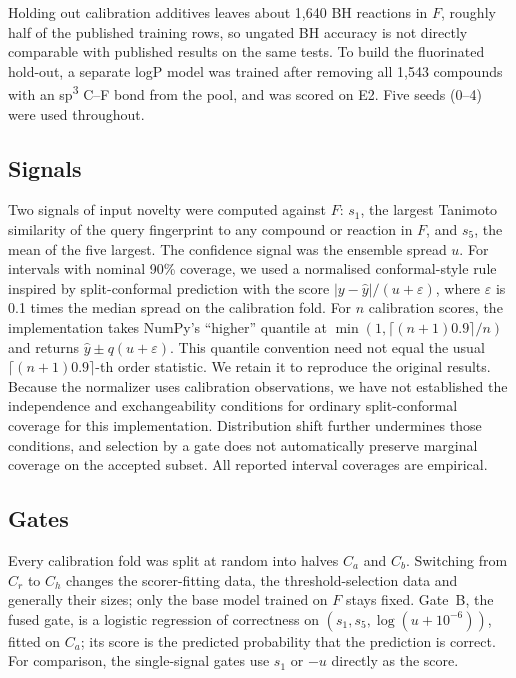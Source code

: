 \documentclass[11pt,letterpaper]{article}
\begin{document}
Holding out calibration additives leaves about 1,640 BH reactions in $F$, roughly half of the published training rows, so ungated BH accuracy is not directly comparable with published results on the same tests. To build the fluorinated hold-out, a separate logP model was trained after removing all 1,543 compounds with an sp\textsuperscript{3} C--F bond from the pool, and was scored on E2. Five seeds (0--4) were used throughout.

\subsection{Signals}

Two signals of input novelty were computed against $F$: $s_1$, the largest Tanimoto similarity of the query fingerprint to any compound or reaction in $F$, and $s_5$, the mean of the five largest. The confidence signal was the ensemble spread $u$. For intervals with nominal 90\% coverage, we used a normalised conformal-style rule inspired by split-conformal prediction\cite{lei2018} with the score $|y-\hat{y}|/(u+\varepsilon)$, where $\varepsilon$ is 0.1 times the median spread on the calibration fold. For $n$ calibration scores, the implementation takes NumPy's ``higher'' quantile at $\min(1,\lceil(n+1)0.9\rceil/n)$ and returns $\hat{y}\pm q(u+\varepsilon)$. This quantile convention need not equal the usual $\lceil(n+1)0.9\rceil$-th order statistic. We retain it to reproduce the original results. Because the normalizer uses calibration observations, we have not established the independence and exchangeability conditions for ordinary split-conformal coverage for this implementation. Distribution shift further undermines those conditions, and selection by a gate does not automatically preserve marginal coverage on the accepted subset. All reported interval coverages are empirical.

\subsection{Gates}

Every calibration fold was split at random into halves $C_a$ and $C_b$. Switching from $C_r$ to $C_h$ changes the scorer-fitting data, the threshold-selection data and generally their sizes; only the base model trained on $F$ stays fixed. Gate~B, the fused gate, is a logistic regression of correctness on $(s_1, s_5, \log(u+10^{-6}))$, fitted on $C_a$; its score is the predicted probability that the prediction is correct. For comparison, the single-signal gates use $s_1$ or $-u$ directly as the score.
\end{document}

